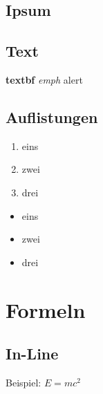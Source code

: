 	\subsection{Ipsum}
	\begin{frame}{\subsecname}
		\blinditemize
	\end{frame}

	\subsection{Text}
	\begin{frame}{\subsecname}
		\textbf{textbf}
		\emph{emph}
		\alert{alert}
		\color{gray}{custom color}
	\end{frame}
	
	\subsection{Auflistungen}
	\begin{frame}{\subsecname}

		\begin{minipage}[t]{0.5\textwidth}
			\par\medskip
			\begin{enumerate}
				\item eins
				\item zwei
				\item drei
			\end{enumerate}
		\end{minipage}%
		\begin{minipage}[t]{0.5\textwidth}
			\par\medskip
			\begin{itemize}
				\item eins
				\item zwei
				\item drei
			\end{itemize}
		\end{minipage}

	\end{frame}
	
\section{Formeln}

	\subsection{In-Line}
	\begin{frame}{\subsecname}

		Beispiel: \( E = mc^2 \)
	
	\end{frame}
	

